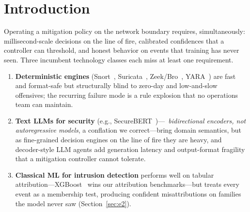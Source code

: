 \documentclass[sigconf,anonymous=false]{acmart}
\begin{document}
\begin{abstract}
partially survives, and the drift is open-set (a family absent from training), which defeats label-shift estimators by assumption. We contribute not novel estimators but a measured account of where typed calibrated decisions help perimeter triage, and where they fail.
\end{abstract}



\maketitle

\section{Introduction}
\label{sec:intro}

Operating a mitigation policy on the network boundary requires, simultaneously: millisecond-scale decisions on the line of fire, calibrated confidences that a controller can threshold, and honest behavior on events that training has never seen. Three incumbent technology classes each miss at least one requirement.

\begin{enumerate}
  \item \textbf{Deterministic engines} (Snort~\cite{roesch1999snort}, Suricata~\cite{suricata}, Zeek/Bro~\cite{paxson1999bro}, YARA~\cite{yara}) are fast and format-safe but structurally blind to zero-day and low-and-slow offensives; the recurring failure mode is a rule explosion that no operations team can maintain.
  \item \textbf{Text LLMs for security} (e.g., SecureBERT~\cite{aghaei2022securebert})---~\emph{bidirectional encoders, not autoregressive models}, a conflation we correct---bring domain semantics, but as fine-grained decision engines on the line of fire they are heavy, and decoder-style LLM agents add generation latency and output-format fragility that a mitigation controller cannot tolerate.
  \item \textbf{Classical ML for intrusion detection} performs well on tabular attribution---XGBoost~\cite{chen2016xgboost} wins our attribution benchmarks---but treats every event as a membership test, producing confident misattributions on families the model never saw (Section~\ref{sec:e2}).
\end{enumerate}
\end{document}
